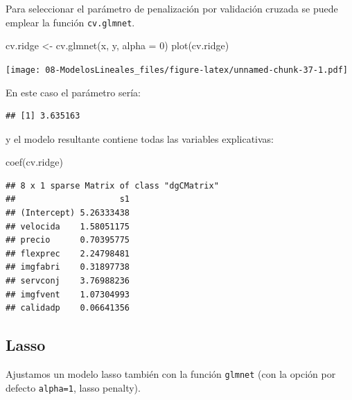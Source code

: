 \documentclass[
]{book}
\newenvironment{Shaded}{\begin{snugshade}}{\end{snugshade}}
\newcommand{\AttributeTok}[1]{\textcolor[rgb]{0.77,0.63,0.00}{#1}}
\newcommand{\DecValTok}[1]{\textcolor[rgb]{0.00,0.00,0.81}{#1}}
\newcommand{\FloatTok}[1]{\textcolor[rgb]{0.00,0.00,0.81}{#1}}
\newcommand{\FunctionTok}[1]{\textcolor[rgb]{0.00,0.00,0.00}{#1}}
\newcommand{\NormalTok}[1]{#1}
\newcommand{\OtherTok}[1]{\textcolor[rgb]{0.56,0.35,0.01}{#1}}
\newcommand{\SpecialCharTok}[1]{\textcolor[rgb]{0.00,0.00,0.00}{#1}}
\theoremstyle{break}
\theoremstyle{nonumberplain}
\begin{document}
Para seleccionar el parámetro de penalización por validación cruzada se puede emplear
la función \texttt{cv.glmnet}.

\begin{Shaded}
\begin{Highlighting}[]
\NormalTok{cv.ridge }\OtherTok{\textless{}{-}} \FunctionTok{cv.glmnet}\NormalTok{(x, y, }\AttributeTok{alpha =} \DecValTok{0}\NormalTok{)}
\FunctionTok{plot}\NormalTok{(cv.ridge)}
\end{Highlighting}
\end{Shaded}

\texttt{[image: 08-ModelosLineales\_files/figure-latex/unnamed-chunk-37-1.pdf]}

En este caso el parámetro sería:

\begin{Shaded}
\end{Shaded}

\begin{verbatim}
## [1] 3.635163
\end{verbatim}

y el modelo resultante contiene todas las variables explicativas:

\begin{Shaded}
\begin{Highlighting}[]
\FunctionTok{coef}\NormalTok{(cv.ridge)}
\end{Highlighting}
\end{Shaded}

\begin{verbatim}
## 8 x 1 sparse Matrix of class "dgCMatrix"
##                     s1
## (Intercept) 5.26333438
## velocida    1.58051175
## precio      0.70395775
## flexprec    2.24798481
## imgfabri    0.31897738
## servconj    3.76988236
## imgfvent    1.07304993
## calidadp    0.06641356
\end{verbatim}

\hypertarget{lasso}{%
\subsection{Lasso}\label{lasso}}

Ajustamos un modelo lasso también con la función \texttt{glmnet} (con la opción por defecto \texttt{alpha=1}, lasso penalty).
\end{document}
